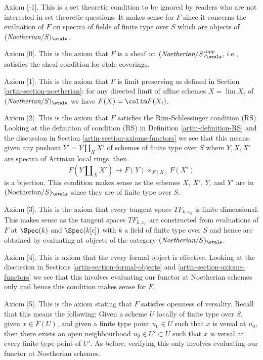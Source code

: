 \medskip\noindent
Axiom [-1]. This is a set theoretic condition to be ignored
by readers who are not interested in set theoretic questions.
It makes sense for $F$ since it concerns the evaluation of
$F$ on spectra of fields of finite type over $S$ which are
objects of $(\textit{Noetherian}/S)_\etale$.

\medskip\noindent
Axiom [0]. This is the axiom that $F$ is a sheaf
on $(\textit{Noetherian}/S)_\etale^{opp}$, i.e., satisfies
the sheaf condition for \'etale coverings.

\medskip\noindent
Axiom [1]. This is the axiom that $F$ is limit preserving as defined
in Section \ref{artin-section-noetherian}:  for any
directed limit of affine schemes $X = \lim X_i$ of
$(\textit{Noetherian}/S)_\etale$ we have $F(X) = \colim F(X_i)$.

\medskip\noindent
Axiom [2]. This is the axiom that  $F$ satisfies the Rim-Schlessinger
condition (RS). Looking at the definition of condition (RS) in
Definition \ref{artin-definition-RS} and the discussion in
Section \ref{artin-section-axioms-functors}
we see that this means: given any pushout $Y' = Y \amalg_X X'$
of schemes of finite type over $S$ where $Y, X, X'$
are spectra of Artinian local rings, then
$$
F(Y \amalg_X X') \to F(Y) \times_{F(X)} F(X')
$$
is a bijection. This condition makes sense as the schemes
$X$, $X'$, $Y$, and $Y'$ are in $(\text{Noetherian}/S)_\etale$
since they are of finite type over $S$.

\medskip\noindent
Axiom [3]. This is the axiom that every tangent space $TF_{k, x_0}$
is finite dimensional. This makes sense as the tangent spaces $TF_{k, x_0}$
are constructed from evaluations of $F$ at $\Spec(k)$ and
$\Spec(k[\epsilon])$ with $k$ a field of finite type over $S$
and hence are obtained by evaluating at objects of the category
$(\textit{Noetherian}/S)_\etale$.

\medskip\noindent
Axiom [4]. This is axiom that the every formal object is effective.
Looking at the discussion in
Sections \ref{artin-section-formal-objects} and \ref{artin-section-axioms-functors}
we see that this involves evaluating our functor at Noetherian schemes
only and hence this condition makes sense for $F$.

\medskip\noindent
Axiom [5]. This is the axiom stating that $F$ satisfies openness of versality.
Recall that this means the following: Given a scheme $U$
locally of finite type over $S$, given $x \in F(U)$, and given
a finite type point $u_0 \in U$ such that $x$ is versal at $u_0$,
then there exists an open neighbourhood $u_0 \in U' \subset U$
such that $x$ is versal at every finite type point of $U'$.
As before, verifying this only involves evaluating
our functor at Noetherian schemes.

